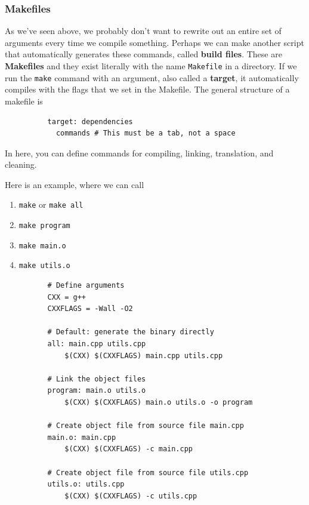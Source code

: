 \documentclass{article}
\newcounter{definition}[section]
\newcounter{example}[section]
\begin{document}
    \subsubsection{Makefiles} 
    
      \begin{definition}[Makefiles]
        \label{def:makefiles}
        As we've seen above, we probably don't want to rewrite out an entire set of arguments every time we compile something. Perhaps we can make another script that automatically generates these commands, called \textbf{build files}. These are \textbf{Makefiles} and they exist literally with the name \texttt{Makefile} in a directory. If we run the \texttt{make} command with an argument, also called a \textbf{target}, it automatically compiles with the flags that we set in the Makefile. The general structure of a makefile is 
        \begin{lstlisting}
          target: dependencies 
            commands # This must be a tab, not a space
        \end{lstlisting}
        In here, you can define commands for compiling, linking, translation, and cleaning.  
      \end{definition}

      \begin{example}
        \label{ex:representative-makefile}
        Here is an example, where we can call 
        \begin{enumerate}
          \item \texttt{make} or \texttt{make all} 
          \item \texttt{make program}
          \item \texttt{make main.o} 
          \item \texttt{make utils.o}
        \end{enumerate}
        \begin{lstlisting}
          # Define arguments 
          CXX = g++
          CXXFLAGS = -Wall -O2

          # Default: generate the binary directly
          all: main.cpp utils.cpp 
              $(CXX) $(CXXFLAGS) main.cpp utils.cpp

          # Link the object files
          program: main.o utils.o
              $(CXX) $(CXXFLAGS) main.o utils.o -o program

          # Create object file from source file main.cpp
          main.o: main.cpp
              $(CXX) $(CXXFLAGS) -c main.cpp

          # Create object file from source file utils.cpp
          utils.o: utils.cpp
              $(CXX) $(CXXFLAGS) -c utils.cpp        
        \end{lstlisting}
      \end{example}
\end{document}
